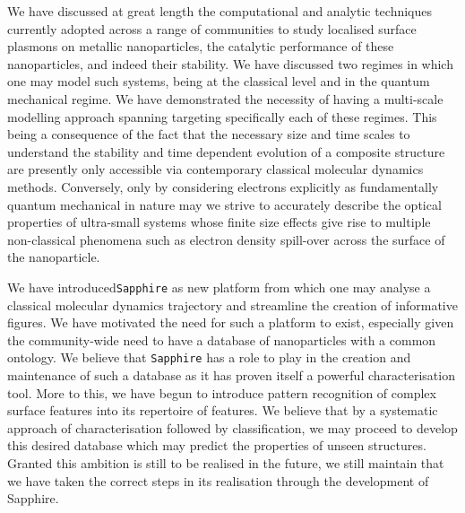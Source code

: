 We have discussed at great length the computational and analytic techniques currently adopted across a range of communities to study localised surface plasmons on metallic nanoparticles, the catalytic performance of these nanoparticles, and indeed their stability. We have discussed two regimes in which one may model such systems, being at the classical level and in the quantum mechanical regime. We have demonstrated the necessity of having a multi-scale modelling approach spanning targeting specifically each of these regimes. This being a consequence of the fact that the necessary size and time scales to understand the stability and time dependent evolution of a composite structure are presently only accessible via contemporary classical molecular dynamics methods. Conversely, only by considering electrons explicitly as fundamentally quantum mechanical in nature may we strive to accurately describe the optical properties of ultra-small systems whose finite size effects give rise to multiple non-classical phenomena such as electron density spill-over across the surface of the nanoparticle.

We have introduced\texttt{Sapphire} as new platform from which one may analyse a classical molecular dynamics trajectory and streamline the creation of informative figures. We have motivated the need for such a platform to exist, especially given the community-wide need to have a database of nanoparticles with a common ontology. We believe that \texttt{Sapphire} has a role to play in the creation and maintenance of such a database as it has proven itself a powerful characterisation tool. More to this, we have begun to introduce pattern recognition of complex surface features into its repertoire of features. We believe that by a systematic approach of characterisation followed by classification, we may proceed to develop this desired database which may predict the properties of unseen structures. Granted this ambition is still to be realised in the future, we still maintain that we have taken the correct steps in its realisation through the development of Sapphire.

